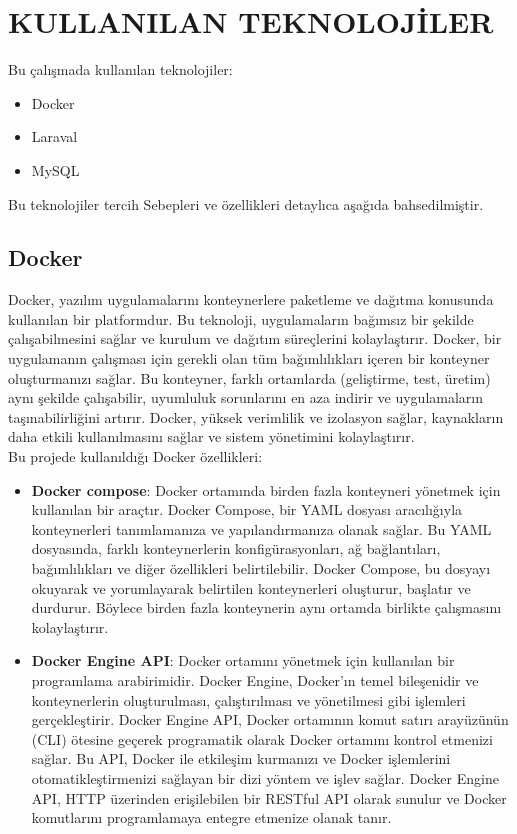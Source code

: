 \section{KULLANILAN TEKNOLOJİLER}
Bu çalışmada kullanılan teknolojiler:
\begin{itemize}
  \item Docker
  \item Laraval
  \item MySQL
\end{itemize} 
Bu teknolojiler tercih Sebepleri ve özellikleri detaylıca aşağıda bahsedilmiştir.
\subsection{Docker}\label{subsec:docker}
Docker, yazılım uygulamalarını konteynerlere paketleme ve dağıtma konusunda kullanılan bir platformdur. Bu teknoloji, uygulamaların bağımsız bir şekilde çalışabilmesini sağlar ve kurulum ve dağıtım süreçlerini kolaylaştırır. Docker, bir uygulamanın çalışması için gerekli olan tüm bağımlılıkları içeren bir konteyner oluşturmanızı sağlar. Bu konteyner, farklı ortamlarda (geliştirme, test, üretim) aynı şekilde çalışabilir, uyumluluk sorunlarını en aza indirir ve uygulamaların taşınabilirliğini artırır. Docker, yüksek verimlilik ve izolasyon sağlar, kaynakların daha etkili kullanılmasını sağlar ve sistem yönetimini kolaylaştırır.\\
Bu projede kullanıldığı Docker özellikleri:
\begin{itemize}
  \item \textbf{Docker compose}: Docker ortamında birden fazla konteyneri yönetmek için kullanılan bir araçtır. Docker Compose, bir YAML dosyası aracılığıyla konteynerleri tanımlamanıza ve yapılandırmanıza olanak sağlar. Bu YAML dosyasında, farklı konteynerlerin konfigürasyonları, ağ bağlantıları, bağımlılıkları ve diğer özellikleri belirtilebilir. Docker Compose, bu dosyayı okuyarak ve yorumlayarak belirtilen konteynerleri oluşturur, başlatır ve durdurur. Böylece birden fazla konteynerin aynı ortamda birlikte çalışmasını kolaylaştırır.
  \item \textbf{Docker Engine API}: Docker ortamını yönetmek için kullanılan bir programlama arabirimidir. Docker Engine, Docker'ın temel bileşenidir ve konteynerlerin oluşturulması, çalıştırılması ve yönetilmesi gibi işlemleri gerçekleştirir. Docker Engine API, Docker ortamının komut satırı arayüzünün (CLI) ötesine geçerek programatik olarak Docker ortamını kontrol etmenizi sağlar. Bu API, Docker ile etkileşim kurmanızı ve Docker işlemlerini otomatikleştirmenizi sağlayan bir dizi yöntem ve işlev sağlar. Docker Engine API, HTTP üzerinden erişilebilen bir RESTful API olarak sunulur ve Docker komutlarını programlamaya entegre etmenize olanak tanır.
\end{itemize}

